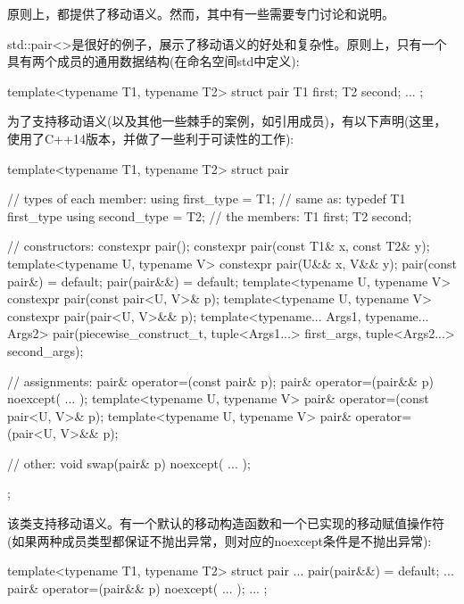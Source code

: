 原则上，都提供了移动语义。然而，其中有一些需要专门讨论和说明。\par


std::pair<>是很好的例子，展示了移动语义的好处和复杂性。原则上，只有一个具有两个成员的通用数据结构(在命名空间std中定义):\par

\begin{codebox}[cpp]
template<typename T1, typename T2>
struct pair {
  T1 first;
  T2 second;
  ...
};
\end{codebox}

为了支持移动语义(以及其他一些棘手的案例，如引用成员)，有以下声明(这里，使用了C++14版本，并做了一些利于可读性的工作):\par

\begin{codebox}[cpp]
template<typename T1, typename T2>
struct pair {
  // types of each member:
  using first_type = T1; // same as: typedef T1 first_type
  using second_type = T2;
  // the members:
  T1 first;
  T2 second;

  // constructors:
  constexpr pair();
  constexpr pair(const T1& x, const T2& y);
  template<typename U, typename V> constexpr pair(U&& x, V&& y);
  pair(const pair&) = default;
  pair(pair&&) = default;
  template<typename U, typename V> constexpr pair(const pair<U, V>& p);
  template<typename U, typename V> constexpr pair(pair<U, V>&& p);
  template<typename... Args1, typename... Args2>
  pair(piecewise_construct_t, tuple<Args1...> first_args,
  tuple<Args2...> second_args);

  // assignments:
  pair& operator=(const pair& p);
  pair& operator=(pair&& p) noexcept( ... );
  template<typename U, typename V> pair& operator=(const pair<U, V>& p);
  template<typename U, typename V> pair& operator=(pair<U, V>&& p);

  // other:
  void swap(pair& p) noexcept( ... );
};
\end{codebox}

该类支持移动语义。有一个默认的移动构造函数和一个已实现的移动赋值操作符(如果两种成员类型都保证不抛出异常，则对应的noexcept条件是不抛出异常):\par

\begin{codebox}[cpp]
template<typename T1, typename T2>
struct pair {
  ...
  pair(pair&&) = default;
  ...
  pair& operator=(pair&& p) noexcept( ... );
  ...
};
\end{codebox}


